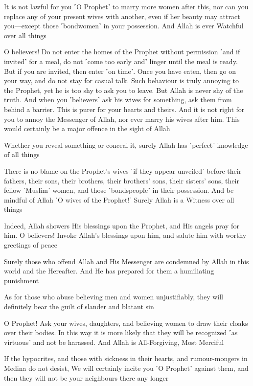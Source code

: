 It is not lawful for you ˹O Prophet˺ to marry more women after this, nor can you replace any of your present wives with another, even if her beauty may attract you—except those ˹bondwomen˺ in your possession. And Allah is ever Watchful over all things

O believers! Do not enter the homes of the Prophet without permission ˹and if invited˺ for a meal, do not ˹come too early and˺ linger until the meal is ready. But if you are invited, then enter ˹on time˺. Once you have eaten, then go on your way, and do not stay for casual talk. Such behaviour is truly annoying to the Prophet, yet he is too shy to ask you to leave. But Allah is never shy of the truth. And when you ˹believers˺ ask his wives for something, ask them from behind a barrier. This is purer for your hearts and theirs. And it is not right for you to annoy the Messenger of Allah, nor ever marry his wives after him. This would certainly be a major offence in the sight of Allah

Whether you reveal something or conceal it, surely Allah has ˹perfect˺ knowledge of all things

There is no blame on the Prophet’s wives ˹if they appear unveiled˺ before their fathers, their sons, their brothers, their brothers’ sons, their sisters’ sons, their fellow ˹Muslim˺ women, and those ˹bondspeople˺ in their possession. And be mindful of Allah ˹O wives of the Prophet!˺ Surely Allah is a Witness over all things

Indeed, Allah showers His blessings upon the Prophet, and His angels pray for him. O believers! Invoke Allah’s blessings upon him, and salute him with worthy greetings of peace

Surely those who offend Allah and His Messenger are condemned by Allah in this world and the Hereafter. And He has prepared for them a humiliating punishment

As for those who abuse believing men and women unjustifiably, they will definitely bear the guilt of slander and blatant sin

O Prophet! Ask your wives, daughters, and believing women to draw their cloaks over their bodies. In this way it is more likely that they will be recognized ˹as virtuous˺ and not be harassed. And Allah is All-Forgiving, Most Merciful

If the hypocrites, and those with sickness in their hearts, and rumour-mongers in Medina do not desist, We will certainly incite you ˹O Prophet˺ against them, and then they will not be your neighbours there any longer

